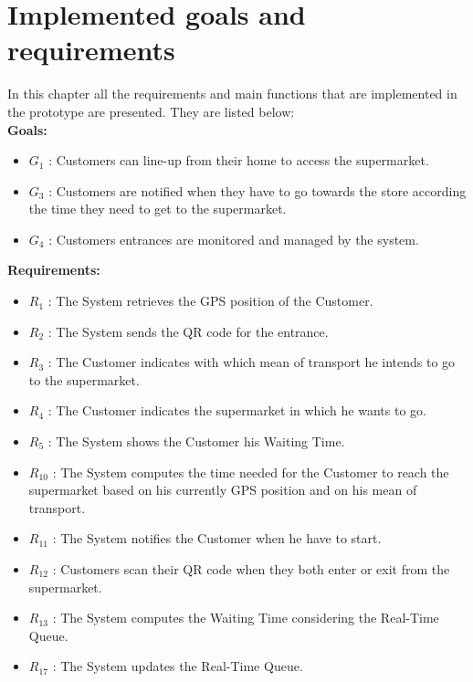 \chapter{Implemented goals and requirements}


In this chapter all the requirements and main functions that are implemented in the prototype are presented. They are listed below:\\
\textbf{Goals:}
\begin{itemize}
	\item $G_1$ : Customers can line-up from their home to access the supermarket.
	\item $G_3$ : Customers are notified when they have to go towards the store according the time they need to get to the supermarket. 
	\item $G_4$ : Customers entrances are monitored and managed by the system.
\end{itemize}
\textbf{Requirements:}
\begin{itemize}
	\item $R_1$ : The System retrieves the GPS position of the Customer.
	\item $R_2$ : The System sends the QR code for the entrance.
	\item $R_3$ : The Customer indicates with which mean of transport he intends to go to the supermarket.
	\item $R_4$ : The Customer indicates the supermarket in which he wants to go.
	\item $R_5$ : The System shows the Customer his Waiting Time.
	\item $R_{10}$ : The System computes the time needed for the Customer to reach the supermarket based on his currently GPS position and on his mean of transport.
	\item $R_{11}$ : The System notifies the Customer when he have to start.
	\item $R_{12}$ : Customers scan their QR code when they both enter or exit from the supermarket.
	\item $R_{13}$ : The System computes the Waiting Time considering the Real-Time Queue.
	\item $R_{17}$ : The System updates the Real-Time Queue.
\end{itemize}

